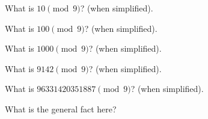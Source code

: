\mbox{}
  \begin{myenum}  
  \item What is $10 \pmod{9}$? (when simplified).
  \item What is $100 \pmod{9}$? (when simplified).
  \item What is $1000 \pmod{9}$? (when simplified).
  \item What is $9142 \pmod{9}$? (when simplified).  
  \item What is $96331420351887 \pmod{9}$? (when simplified).
  \item What is the general fact here?
  \end{myenum}
